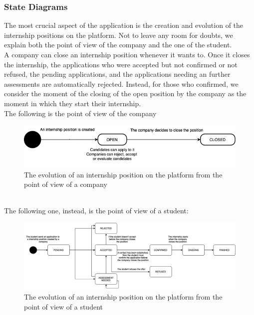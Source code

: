     \subsubsection{State Diagrams}
        The most crucial aspect of the application is the creation and evolution of the internship positions on the platform. Not to leave any room for doubts, we explain both the point of view of the company and the one of the student.
        \\
        A company can close an internship position whenever it wants to. Once it closes the internship, the applications who were accepted but not confirmed or not refused, the pending applications, and the applications needing an further assessments are automatically rejected. Instead, for those who confirmed, we consider the moment of the closing of the open position by the company as the moment in which they start their internship.
        \\
        The following is the point of view of the company
        \begin{figure}[h!]
            \centering
            \includegraphics[width=1\textwidth]{RASD/Images/CompanyPOV.png}
            \caption{The evolution of an internship position on the platform from the point of view of a company}
            \label{fig:example}
        \end{figure}
        \\
        \newpage
        The following one, instead, is the point of view of a student:
        \begin{figure}[h!]
            \centering
            \includegraphics[width=1\textwidth]{RASD/Images/StudentPOV.png}
            \caption{The evolution of an internship position on the platform from the point of view of a student}
            \label{fig:example}
        \end{figure}
        

